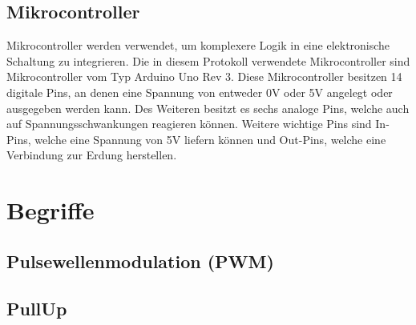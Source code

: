 \subsection{Mikrocontroller \cite{arduino-r3}}
\label{subsec:mikrocontroller}

Mikrocontroller werden verwendet, um komplexere Logik in eine elektronische Schaltung zu integrieren.
Die in diesem Protokoll verwendete Mikrocontroller sind Mikrocontroller vom Typ Arduino Uno Rev 3.
Diese Mikrocontroller besitzen 14 digitale Pins, an denen eine Spannung von entweder 0V oder 5V angelegt oder ausgegeben werden kann.
Des Weiteren besitzt es sechs analoge Pins, welche auch auf Spannungsschwankungen reagieren können.
Weitere wichtige Pins sind In-Pins, welche eine Spannung von 5V liefern können und Out-Pins, welche eine Verbindung zur Erdung herstellen.

\section{Begriffe}
\label{sec:begriffe}

\subsection{Pulsewellenmodulation (PWM)}
\label{subsec:pulsewellenmodulation-(pwm)}

\subsection{PullUp}
\label{subsec:pullup}
